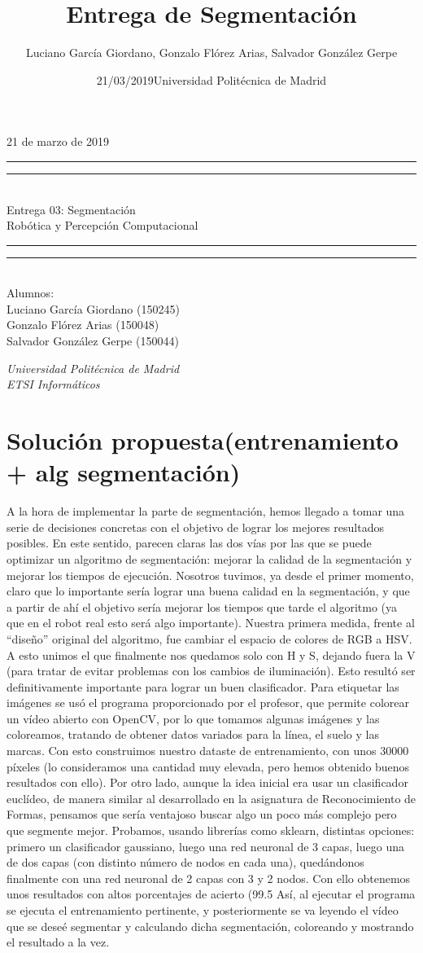 \documentclass{article}
\title{Entrega de Segmentación}
\author{Luciano García Giordano, Gonzalo Flórez Arias, Salvador González Gerpe}
\date{21/03/2019}
\date{Universidad Politécnica de Madrid}
\newcommand*{\frontPageEC}[2]{
    \begingroup %
        \centering %
        \vspace*{\baselineskip} %
        {\begin{flushright} \LARGE #1  \end{flushright}}
        \vspace*{\baselineskip}
        \rule{\textwidth}{1.6pt}\vspace*{-\baselineskip}\vspace*{2pt} %
        \rule{\textwidth}{0.4pt}\\[\baselineskip] %
        {\LARGE #2  \\[0.8\baselineskip] \large{Robótica y Percepción Computacional}}\\[0.2\baselineskip] %
        \rule{\textwidth}{0.4pt}\vspace*{-\baselineskip}\vspace{3.2pt} %
        \rule{\textwidth}{1.6pt}\\[\baselineskip] %
        \vspace*{2\baselineskip} %
        Alumnos: \\[\baselineskip]
        {\Large Luciano García Giordano (150245)} \\
        {\Large Gonzalo Flórez Arias (150048)} \\
        {\Large Salvador González Gerpe (150044)} \\
        
        \vfill
        
        {\itshape Universidad Politécnica de Madrid \\ ETSI Informáticos\par} %
    \endgroup}
\begin{document}
\frontPageEC{21 de marzo de 2019}{Entrega 03: Segmentación}
\thispagestyle{empty}

\newpage
\tableofcontents
\setcounter{page}{1}

\clearpage
\newpage



\section{Solución propuesta(entrenamiento + alg segmentación)}
A la hora de implementar la parte de segmentación, hemos llegado a tomar una serie de decisiones concretas con el objetivo de lograr los mejores resultados posibles. En este sentido, parecen claras las dos vías por las que se puede optimizar un algoritmo de segmentación: mejorar la calidad de la segmentación y mejorar los tiempos de ejecución.
Nosotros tuvimos, ya desde el primer momento, claro que lo importante sería lograr una buena calidad en la segmentación, y que a partir de ahí el objetivo sería mejorar los tiempos que tarde el algoritmo (ya que en el robot real esto será algo importante). 
Nuestra primera medida, frente al “diseño” original del algoritmo, fue cambiar el espacio de colores de RGB a HSV. A esto unimos el que finalmente nos quedamos solo con H y S, dejando fuera la V (para tratar de evitar problemas con los cambios de iluminación). Esto resultó ser definitivamente importante para lograr un buen clasificador.
Para etiquetar las imágenes se usó el programa proporcionado por el profesor, que permite colorear un vídeo abierto con OpenCV, por lo que tomamos algunas imágenes y las coloreamos, tratando de obtener datos variados para la línea, el suelo y las marcas. Con esto construimos nuestro dataste de entrenamiento, con unos 30000 píxeles (lo consideramos una cantidad muy elevada, pero hemos obtenido buenos resultados con ello).
Por otro lado, aunque la idea inicial era usar un clasificador euclídeo, de manera similar al desarrollado en la asignatura de Reconocimiento de Formas, pensamos que sería ventajoso buscar algo un poco más complejo pero que segmente mejor. Probamos, usando librerías como sklearn, distintas opciones: primero un clasificador gaussiano, luego una red neuronal de 3 capas, luego una de dos capas (con distinto número de nodos en cada una), quedándonos finalmente con una red neuronal de 2 capas con 3 y 2 nodos. Con ello obtenemos unos resultados con altos porcentajes de acierto (99.5%
Así, al ejecutar el programa se ejecuta el entrenamiento pertinente, y posteriormente se va leyendo el vídeo que se deseé segmentar y calculando dicha segmentación, coloreando y mostrando el resultado a la vez.
\end{document}
